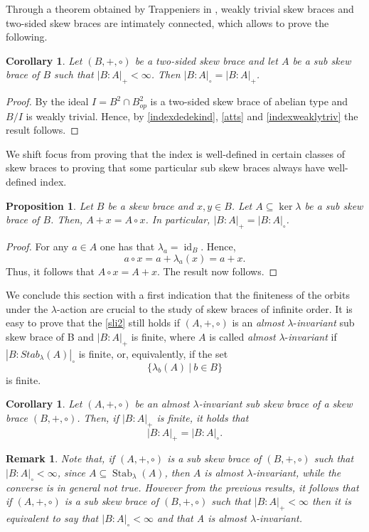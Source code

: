 \documentclass{amsart}
\newcommand{\id}{\operatorname{id}}
\newcommand{\Stab}{\operatorname{Stab}}
\newtheorem{cor}[thm]{Corollary}
\newtheorem{pro}[thm]{Proposition}
\newtheorem{rem}[thm]{Remark}
\begin{document}
Through a theorem obtained by Trappeniers in \cite{Trappeniers}, weakly trivial skew braces and two-sided skew braces are intimately connected, which allows to prove the following.

\begin{cor}
    Let $(B,+,\circ)$ be a two-sided skew brace and let $A$ be a sub skew brace of $B$ such that $|B:A|_+<\infty$. Then $|B:A|_\circ =|B:A|_+$.
\end{cor}

\begin{proof}
    By \cite{Trappeniers} the ideal $I=B^2\cap B^2_{op}$ is a two-sided skew brace of abelian type and $B/I$ is weakly trivial. Hence, by \cref{indexdedekind},  \cref{atts} and \cref{indexweaklytriv} the result follows. 
\end{proof}


We shift focus from proving that the index is well-defined in certain classes of skew braces to proving that some particular sub skew braces always have well-defined index. 
 \begin{pro}\label{inker}
      Let $B$ be a skew brace and $x,y\in B$. Let $A \subseteq \ker \lambda $ be a sub skew brace of $B$. Then, $ A + x =A \circ x$. In particular, $ |B:A|_+ =|B:A|_{\circ} $.
 \end{pro}
 \begin{proof}
For any $a \in A$ one has that $\lambda_a=\id_B$. Hence, $$ a \circ x = a + \lambda_a(x) = a + x.$$
Thus, it follows that $A \circ x = A + x$. The result now follows.
 \end{proof}
 
We conclude this section with a first indication that the finiteness of the orbits under the $\lambda$-action are crucial to the study of skew braces of infinite order. It is easy to prove that the \cref{sli2} still holds if $(A,+,\circ)$ is an \textit{almost} $\lambda$-\textit{invariant} sub skew brace of B and $|B:A|_+$ is finite, where $A$ is called \textit{almost} $\lambda$-\textit{invariant} if $|B:Stab_\lambda(A)|_\circ$ is finite, or, equivalently, if the set $$\{\lambda_b(A) \ | \ b\in B\}$$ is finite. 

\begin{cor}
Let $(A,+,\circ)$ be an \textit{almost} $\lambda$-\textit{invariant} sub skew brace of a skew brace $(B,+,\circ)$. Then, if $|B:A|_+$ is finite, it holds that $$|B:A|_+=|B:A|_\circ.$$
\end{cor}

\begin{rem}
Note that, if $(A,+,\circ)$ is a sub skew brace of $(B,+,\circ)$ such that $|B:A|_\circ<\infty$, since $A\subseteq \Stab_\lambda(A)$, then $A$ is almost $\lambda$-invariant, while the converse is in general not true. However from the previous results, it follows that if $(A,+,\circ)$ is a sub skew brace of $(B,+,\circ)$ such that $|B:A|_+<\infty$ then it is equivalent to say that $|B:A|_\circ<\infty$ and that A is almost $\lambda$-invariant.
\end{rem}
\end{document}
